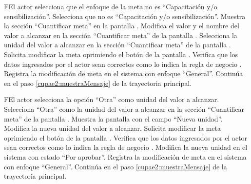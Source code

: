 \begin{UCtrayectoriaA}{E}{El actor selecciona que el enfoque de la meta no es ``Capacitación y/o sensibilización''.}
	\UCpaso[\UCactor] Selecciona que  no es ``Capacitación y/o sensibilización''. 
	\UCpaso[\UCsist] Muestra la sección ``Cuantificar meta'' en la pantalla .
	\UCpaso[\UCactor] Modifica el valor y el nombre del valor a alcanzar en la sección ``Cuantificar meta'' de la pantalla .
	\UCpaso[\UCactor] Selecciona la unidad del valor a alcanzar en la sección ``Cuantificar meta'' de la pantalla . 
	\UCpaso[\UCactor] Solicita modificar la meta oprimiendo el botón  de la pantalla .  
	\UCpaso[\UCsist] Verifica que los datos ingresados por el actor sean correctos como lo indica la regla de negocio .   
	\UCpaso[\UCsist] Registra la modificación de meta en el sistema con enfoque ``General''.
	\UCpaso[] Continúa en el paso \ref{cupae2:muestraMensaje} de la trayectoria principal.
\end{UCtrayectoriaA}

\begin{UCtrayectoriaA}{F}{El actor selecciona la opción ``Otra'' como unidad del valor a alcanzar.}
	\UCpaso[\UCactor] Selecciona ``Otra'' como la unidad del valor a alcanzar en la sección ``Cuantificar meta'' de la pantalla .
	\UCpaso[\UCsist] Muestra la pantalla   con el campo ``Nueva unidad''.
	\UCpaso[\UCactor] Modifica la nueva unidad del valor a alcanzar.
	\UCpaso[\UCactor] Solicita modificar la meta oprimiendo el botón  de la pantalla .  
	\UCpaso[\UCsist] Verifica que los datos ingresados por el actor sean correctos como lo indica la regla de negocio .   
	\UCpaso[\UCsist] Modifica la nueva unidad en el sistema con estado ``Por aprobar''.
	\UCpaso[\UCsist] Registra la modificación de meta en el sistema con enfoque ``General''.
	\UCpaso[] Continúa en el paso \ref{cupae2:muestraMensaje} de la trayectoria principal.
\end{UCtrayectoriaA} 

